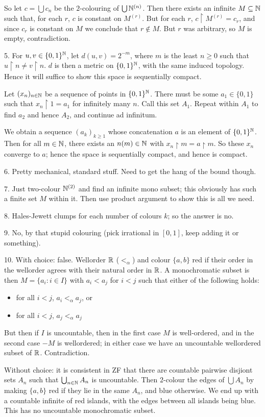 \documentclass[10pt]{article}
\begin{document}
So let $c = \bigcup c_n$ be the $2$-colouring of $\bigcup \mathbb{N}^{(n)}$. Then there exists an infinite $M\subseteq \mathbb{N}$ such that, for each $r$, $c$ is constant on $M^{(r)}$. But for each $r$, $c\restriction M^{(r)} = c_r$, and since $c_r$ is constant on $M$ we conclude that $r \not \in M$. But $r$ was arbitrary, so $M$ is empty, contradiction.

5. For $u,v \in \{0,1\}^{\mathbb{N}}$, let $d(u,v) = 2^{-m}$, where $m$ is the least $n\ge 0$ such that $u\restriction n \ne v \restriction n$. $d$ is then a metric on $\{0,1\}^{\mathbb{N}}$, with the same induced topology. Hence it will suffice to show this space is sequentially compact.

Let $(x_n)_{n\in\mathbb{N}}$ be a sequence of points in $\{0,1\}^{\mathbb{N}}$. There must be some $a_1 \in \{0,1\}$ such that $x_n\restriction 1 = a_1$ for infinitely many $n$. Call this set $A_1$. Repeat within $A_1$ to find $a_2$ and hence $A_2$, and continue ad infinitum.

We obtain a sequence $(a_k)_{k\ge 1}$ whose concatenation $a$ is an element of $\{0,1\}^{\mathbb{N}}$. Then for all $m\in \mathbb{N}$, there exists an $n(m)\in\mathbb{N}$ with $x_n\restriction m = a\restriction m$. So these $x_n$ converge to $a$; hence the space is sequentially compact, and hence is compact.

6. Pretty mechanical, standard stuff. Need to get the hang of the bound though.

7. Just two-colour $\mathbb{N}^{(2)}$ and find an infinite mono subset; this obviously has such a finite set $M$ within it. Then use product argument to show this is all we need.

8. Hales-Jewett clumps for each number of colours $k$; so the answer is no.

9. No, by that stupid colouring (pick irrational in $[0,1]$, keep adding it or something).

10. With choice: false. Wellorder $\mathbb{R}$ ($<_\alpha$) and colour $\{a,b\}$ red if their order in the wellorder agrees with their natural order in $\mathbb{R}$. A monochromatic subset is then $M = \{a_i : i \in I\}$ with $a_i < a_j$ for $i < j$ such that either of the following holds:
\begin{itemize}
    \item for all $i < j$, $a_i <_\alpha a_j$, or
    \item for all $i < j$, $a_j <_\alpha a_j$
\end{itemize}
But then if $I$ is uncountable, then in the first case $M$ is well-ordered, and in the second case $-M$ is wellordered; in either case we have an uncountable wellordered subset of $\mathbb{R}$. Contradiction.

Without choice: it is consistent in ZF that there are countable pairwise disjiont sets $A_n$ such that $\bigcup_{n\in\mathbb{N}}A_n$ is uncountable. Then $2$-colour the edges of $\bigcup A_n$ by making $\{a,b\}$ red if they lie in the same $A_n$, and blue otherwise. We end up with a countable infinite of red islands, with the edges between all islands being blue. This has no uncountable monochromatic subset.
\end{document}
